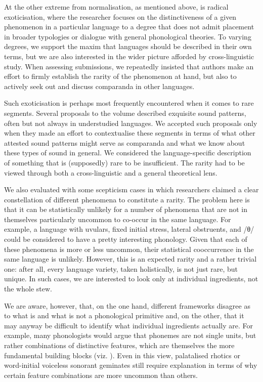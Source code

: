\documentclass[output=paper]{langscibook}
\begin{document}
At the other extreme from normalisation, as mentioned above, is radical exoticisation, where the researcher focuses on the distinctiveness of a given phenomenon in a particular language to a degree that does not admit placement in broader typologies or dialogue with general phonological theories. To varying degrees, we support the maxim that languages should be described in their own terms, but we are also interested in the wider picture afforded by cross-linguistic study. When assessing submissions, we repeatedly insisted that authors make an effort to firmly establish the rarity of the phenomenon at hand, but also to actively seek out and discuss comparanda in other languages.

Such exoticisation is perhaps most frequently encountered when it comes to rare segments. Several proposals to the volume described exquisite sound patterns, often but not always in understudied languages. We accepted such proposals only when they made an effort to contextualise these segments in terms of what other attested sound patterns might serve as comparanda and what we know about these types of sound in general. We considered the language-specific description of something that is (supposedly) rare to be insufficient. The rarity had to be viewed through both a cross-linguistic and a general theoretical lens.

We also evaluated with some scepticism cases in which researchers claimed a clear constellation of different phenomena to constitute a rarity. The problem here is that it can be statistically unlikely for a number of phenomena that are not in themselves particularly uncommon to co-occur in the same language. For example, a language with uvulars, fixed initial stress, lateral obstruents, and \mbox{/θ/} could be considered to have a pretty interesting phonology. Given that each of these phenomena is more or less uncommon, their statistical cooccurrence in the same language is unlikely. However, this is an expected rarity and a rather trivial one: after all, every language variety, taken holistically, is not just rare, but unique. In such cases, we are interested to look only at individual ingredients, not the whole stew.

We are aware, however, that, on the one hand, different frameworks disagree as to what is and what is not a phonological primitive and, on the other, that it may anyway be difficult to identify what individual ingredients actually are. For example, many phonologists would argue that phonemes are not single units, but rather combinations of distinctive features, which are themselves the more fundamental building blocks  (viz. \citealt{VeerEtAl2023}). Even in this view, palatalised rhotics or word-initial voiceless sonorant geminates still require explanation in terms of why certain feature combinations are more uncommon than others. 
\end{document}
